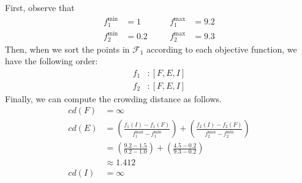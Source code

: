First, observe that
\[
\begin{aligned}
    f^{\min}_1 &= 1 &\quad& f^{\max}_1 &= 9.2 \\
    f^{\min}_2 &= 0.2 &\quad& f^{\max}_2 &= 9.3
\end{aligned}
\]
Then, when we sort the points in \(\mathcal{F}_1\) according to each objective function, we have the following order:
\[
\begin{aligned}
    f_1 &: [F, E, I] \\
    f_2 &: [F, E, I]
\end{aligned}
\]
Finally, we can compute the crowding distance as follows.
\[
\begin{aligned}
    cd(F) &= \infty \\
    cd(E) &= \left(\frac{f_1(I) - f_1(F)}{f_1^{\max} - f_1^{\min}}\right) + \left(\frac{f_2(I) - f_2(F)}{f_2^{\max} - f_2^{\min}}\right) \\
          &= \left(\frac{9.2 - 1.5}{9.2 - 1.0}\right) + \left(\frac{4.5 - 0.2}{9.3 - 0.2}\right) \\
          &\approx 1.412 \\
    cd(I) &= \infty \\
\end{aligned}
\]
